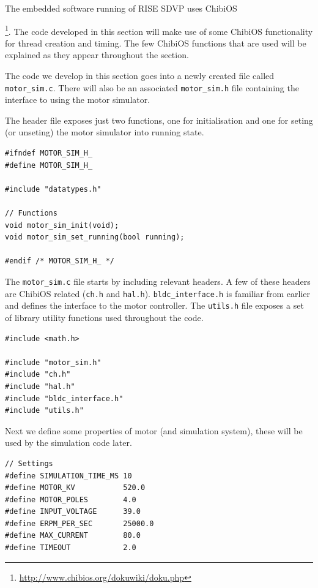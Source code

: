 \documentclass[12pt]{article} %
\begin{document}
The embedded software running of RISE SDVP uses
ChibiOS{\footnote{\url{http://www.chibios.org/dokuwiki/doku.php}}. The
  code developed in this section will make use of some ChibiOS
  functionality for thread creation and timing. The few ChibiOS
  functions that are used will be explained as they appear throughout
  the section.

The code we develop in this section goes into a newly created file
called {\verb!motor_sim.c!}. There will also be an associated
{\verb!motor_sim.h!} file containing the interface to using the motor
simulator.

The header file exposes just two functions, one for initialisation and one for seting (or unseting) the motor simulator into running state.

\begin{Verbatim}[samepage=true,frame=single,label=Embedded/RC\_Controller/motor\_sim.h]
#ifndef MOTOR_SIM_H_
#define MOTOR_SIM_H_

#include "datatypes.h"

// Functions
void motor_sim_init(void);
void motor_sim_set_running(bool running);

#endif /* MOTOR_SIM_H_ */
\end{Verbatim}

The {\verb!motor_sim.c!} file starts by including relevant headers. A
few of these headers are ChibiOS related (\verb!ch.h! and
\verb!hal.h!). \verb!bldc_interface.h! is familiar from earlier and
defines the interface to the motor controller. The \verb!utils.h! file
exposes a set of library utility functions used throughout the code.

\begin{Verbatim}[samepage=true,frame=single,label=Embedded/RC\_Controller/motor\_sim.c]
#include <math.h>

#include "motor_sim.h"
#include "ch.h"
#include "hal.h"
#include "bldc_interface.h"
#include "utils.h"
\end{Verbatim}

Next we define some properties of motor (and simulation system), these will be used by
the simulation code later. 

\begin{Verbatim}[samepage=true,frame=single,label=Embedded/RC\_Controller/motor\_sim.c]  
// Settings
#define SIMULATION_TIME_MS 10
#define MOTOR_KV           520.0
#define MOTOR_POLES        4.0
#define INPUT_VOLTAGE      39.0
#define ERPM_PER_SEC       25000.0
#define MAX_CURRENT        80.0
#define TIMEOUT            2.0
\end{Verbatim}

}
\end{document}
